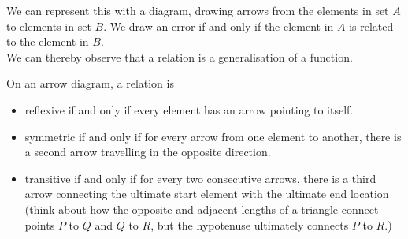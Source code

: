\documentclass{report}
\begin{document}
We can represent this with a diagram, drawing arrows from the elements in set $A$ to elements in set $B$. We draw an error if and only if the element in $A$ is related to the element in $B$. \\

We can thereby observe that a relation is a generalisation of a function.






On an arrow diagram, a relation is
\begin{itemize}
	\item reflexive if and only if every element has an arrow pointing to itself.
	\item symmetric if and only if for every arrow from one element to another, there is a second arrow travelling in the opposite direction.
	\item transitive if and only if for every two consecutive arrows, there is a third arrow connecting the ultimate start element with the ultimate end location (think about how the opposite and adjacent lengths of a triangle connect points $P$ to $Q$ and $Q$ to $R$, but the hypotenuse ultimately connects $P$ to $R$.)
\end{itemize}
\end{document}
